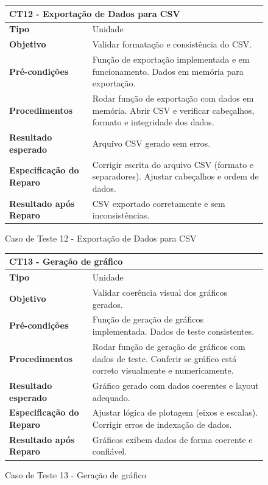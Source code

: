 \begin{figure}[H]
    \centering
\begin{longtable}{|p{}|p{}|}
\hline
\multicolumn{2}{|l|}{\textbf{CT12 - Exportação de Dados para CSV}} \\
\hline
\textbf{Tipo} & Unidade \\
\hline
\textbf{Objetivo} & Validar formatação e consistência do CSV. \\
\hline
\textbf{Pré-condições} & Função de exportação implementada e em funcionamento.  Dados em memória para exportação. \\
\hline
\textbf{Procedimentos} & Rodar função de exportação com dados em memória.  Abrir CSV e verificar cabeçalhos, formato e integridade dos dados. \\
\hline
\textbf{Resultado esperado} & Arquivo CSV gerado sem erros. \\
\hline
\textbf{Especificação do Reparo} & Corrigir escrita do arquivo CSV (formato e separadores).  Ajustar cabeçalhos e ordem de dados. \\
\hline
\textbf{Resultado após Reparo} & CSV exportado corretamente e sem inconsistências. \\
\hline
\end{longtable}
\caption{Caso de Teste 12 - Exportação de Dados para CSV}
\label{fig_ct12_exportacao_dados_csv}
\end{figure}

\begin{figure}[H]
    \centering
\begin{longtable}{|p{}|p{}|}
\hline
\multicolumn{2}{|l|}{\textbf{CT13 - Geração de gráfico}} \\
\hline
\textbf{Tipo} & Unidade \\
\hline
\textbf{Objetivo} & Validar coerência visual dos gráficos gerados. \\
\hline
\textbf{Pré-condições} & Função de geração de gráficos implementada.  Dados de teste consistentes.  \\
\hline
\textbf{Procedimentos} & Rodar função de geração de gráficos com dados de teste.  Conferir se gráfico está correto visualmente e numericamente.  \\
\hline
\textbf{Resultado esperado} & Gráfico gerado com dados coerentes e layout adequado. \\
\hline
\textbf{Especificação do Reparo} &  Ajustar lógica de plotagem (eixos e escalas).  Corrigir erros de indexação de dados.  \\
\hline
\textbf{Resultado após Reparo} & Gráficos exibem dados de forma coerente e confiável. \\
\hline
\end{longtable}
\caption{Caso de Teste 13 - Geração de gráfico}
\label{fig_ct13_geracao_grafico}
\end{figure}

